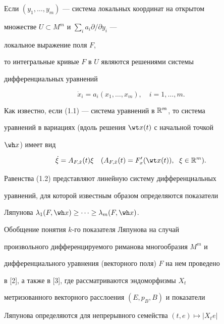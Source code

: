  


Если $(y_1,\dotsc,y_m)$ --- система локальных координат на открытом 


множестве $U\subset M^m$ и $\sum\limits_i a_i\partial/\partial y_i$ --- 


локальное выражение поля $F$, 


то интегральные кривые $F$ в $U$ являются решениями системы 


дифференциальных уравнений 


\begin{equation} 


\Dot x_i=a_i(x_1,\dotsc,x_m),\quad i=1,\dotsc,m. 


\end{equation} 


 


Как известно, если (1.1) --- система уравнений в $\Bbb R^m$, то система 


уравнений в вариациях (вдоль решения $\wt x(t)$ с начальной точкой 


$\wh x$) имеет вид 


\begin{equation} 


\Dot\xi=A_{F,\Hat x}(t)\xi\quad (A_{F,\Hat x}(t)=F'_x(\wt x(t)), 


\ \; \xi\in\Bbb R^m). 


\end{equation} 


 


Равенства (1.2) представляют линейную систему дифференциальных 


уравнений, для которой известным образом определяются показатели 


Ляпунова $\lambda_1(F,\wh x)\ge\dotsb\ge\lambda_m(F,\wh x)$. 


 


Обобщение понятия $k$-го показателя Ляпунова на случай 


произвольного дифференцируемого риманова многообразия $M^m$ и 


дифференциального уравнения (векторного поля) $F$ на нем проведено 


в [2], а также в [3], где рассматриваются эндоморфизмы $X_t$ 


метризованного векторного расслоения $(E,p_B,B)$ и показатели 


Ляпунова определяются для непрерывного семейства $(t,e)\mapsto|X_t e|$ 



